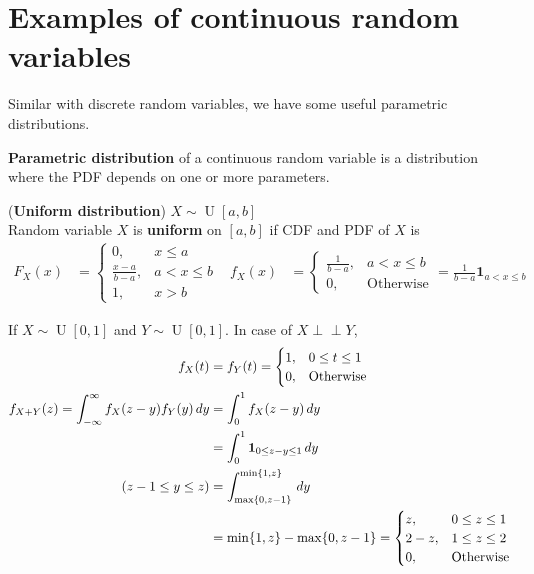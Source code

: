 \documentclass{huhtakm-template-book}
\newcommand{\independent}{\perp\!\!\!\perp}
\DeclareMathOperator{\U}{U}
\begin{document}
\section{Examples of continuous random variables}
Similar with discrete random variables, we have some useful parametric distributions.
\begin{defn}
	\textbf{Parametric distribution} of a continuous random variable is a distribution where the PDF depends on one or more parameters.
\end{defn}
\begin{eg}(\textbf{Uniform distribution}) $X\sim\U[a,b]$\\
	Random variable $X$ is \textbf{uniform} on $[a,b]$ if CDF and PDF of $X$ is
	\begin{align*}
		F_{X}(x)&=\begin{cases}
			0, &x\leq a\\
			\frac{x-a}{b-a}, &a<x\leq b\\
			1, &x>b
		\end{cases} & f_{X}(x)&=\begin{cases}
			\frac{1}{b-a}, &a<x\leq b\\
			0, &\text{Otherwise}
		\end{cases}=\frac{1}{b-a}\mathbf{1}_{a<x\leq b}
	\end{align*}
\end{eg}
\begin{eg}
	If $X\sim\U[0,1]$ and $Y\sim\U[0,1]$. In case of $X\independent Y$,
	\begin{align*}
		f_{X}(t)&=f_{Y}(t)=\begin{cases}
			1, &0\leq t\leq 1\\
			0, &\text{Otherwise}
		\end{cases}\\
		f_{X+Y}(z)=\int_{-\infty}^{\infty} f_{X}(z-y)f_{Y}(y)\,dy&=\int_{0}^{1}f_{X}(z-y)\,dy\\
		&=\int_{0}^{1}\mathbf{1}_{0\leq z-y\leq 1}\,dy\\
		\tag{$z-1\leq y\leq z$}
		&=\int_{\max\{0,z-1\}}^{\min\{1,z\}}\,dy\\
		&=\min\{1,z\}-\max\{0,z-1\}=\begin{cases}
			z, &0\leq z\leq 1\\
			2-z, &1\leq z\leq 2\\
			0, &\text{Otherwise}
		\end{cases}
	\end{align*}
\end{eg}
\end{document}
